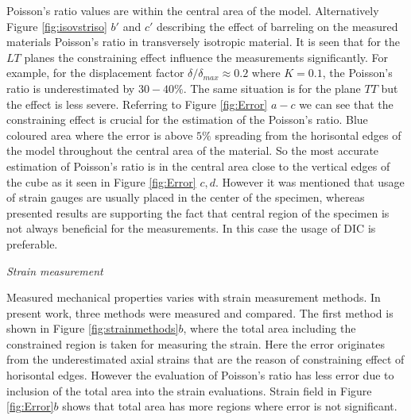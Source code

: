 \documentclass[review]{elsarticle}
\begin{document}
Poisson's ratio values are within the central area of the model. 
Alternatively Figure \ref{fig:isovstriso} $b'$ and $c'$ describing the effect
of barreling on the measured materials Poisson's ratio in transversely isotropic material. 
It is seen that for the $LT$ planes the constraining effect influence the
measurements significantly. For example, for the displacement factor $\delta/\delta_{max}\approx0.2 $ where $K=0.1$,  the Poisson's ratio is
underestimated by $30-40\%$.
The same situation is for the plane $TT$ but the effect is less severe.
Referring to Figure \ref{fig:Error} $a-c$  we can see that the constraining effect is
crucial for the estimation of the Poisson's ratio. Blue coloured area where the error is above $5\%$ spreading from the horisontal edges of 
the model throughout the central area of the material. So the most accurate
estimation of Poisson's ratio is in the central area close to the vertical
edges of the cube as it seen in Figure \ref{fig:Error} $c,d$. However it was
mentioned that usage of strain gauges are usually placed in the center of the
specimen, whereas presented results are supporting the fact that central
region of the specimen is not always beneficial for the measurements. In this
case the usage of DIC is preferable. 


\begin{description}
\item{\textit{Strain measurement}}
\end{description}
Measured mechanical properties varies with strain measurement methods. In
present work, three methods were measured and compared. The
first method is shown in Figure \ref{fig:strainmethods}$b$, where the total area
including the constrained region is taken for measuring the strain.  
Here the error originates from the underestimated axial strains that are the
reason of constraining effect of horisontal edges. However the evaluation of
Poisson's ratio has less error due to inclusion of the total area into the
strain evaluations. Strain field in Figure \ref{fig:Error}$b$ shows that total
area has more regions where error is not significant.
\end{document}
